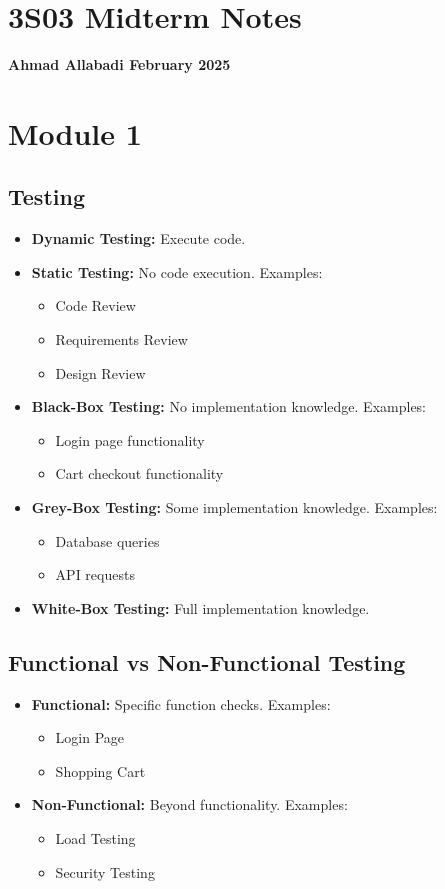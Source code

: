 \documentclass[10pt,portrait]{article}
\begin{document}
\small

\begin{multicols}{ 3 }
\section*{3S03 Midterm Notes}
\textbf{Ahmad Allabadi \hfill February 2025}

\section*{Module 1}
\subsection*{Testing}
\begin{itemize}
    \item \textbf{Dynamic Testing:} Execute code.
    \item \textbf{Static Testing:} No code execution. Examples:
    \begin{itemize}
        \item Code Review
        \item Requirements Review
        \item Design Review
    \end{itemize}
    \item \textbf{Black-Box Testing:} No implementation knowledge. Examples:
    \begin{itemize}
        \item Login page functionality
        \item Cart checkout functionality
    \end{itemize}
    \item \textbf{Grey-Box Testing:} Some implementation knowledge. Examples:
    \begin{itemize}
        \item Database queries
        \item API requests
    \end{itemize}
    \item \textbf{White-Box Testing:} Full implementation knowledge.
\end{itemize}

\subsection*{Functional vs Non-Functional Testing}
\begin{itemize}
    \item \textbf{Functional:} Specific function checks. Examples:
    \begin{itemize}
        \item Login Page
        \item Shopping Cart
    \end{itemize}
    \item \textbf{Non-Functional:} Beyond functionality. Examples:
    \begin{itemize}
        \item Load Testing
        \item Security Testing
    \end{itemize}
\end{itemize}


\end{multicols}
\end{document}
